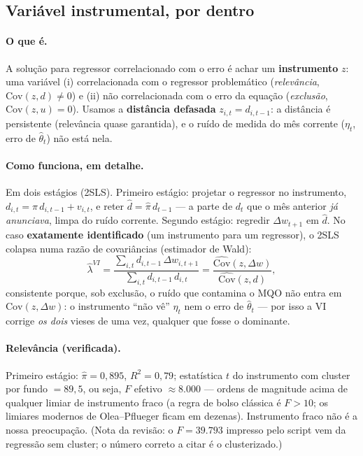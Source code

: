 \documentclass[11pt,a4paper]{article}
\newcommand{\oquee}[0]{\paragraph{O que é.}}
\newcommand{\comofunciona}[0]{\paragraph{Como funciona, em detalhe.}}
\begin{document}
\subsection{Variável instrumental, por dentro}
\label{sec:iv}

\oquee A solução para regressor correlacionado com o erro é achar um \textbf{instrumento} $z$:
uma variável (i) correlacionada com o regressor problemático (\emph{relevância},
$\mathrm{Cov}(z,d)\neq0$) e (ii) não correlacionada com o erro da equação (\emph{exclusão},
$\mathrm{Cov}(z,u)=0$). Usamos a \textbf{distância defasada} $z_{i,t}=d_{i,t-1}$: a distância é
persistente (relevância quase garantida), e o ruído de medida do mês corrente ($\eta_t$, erro de
$\widehat\theta_t$) não está nela.

\comofunciona Em dois estágios (2SLS). Primeiro estágio: projetar o regressor no instrumento,
$d_{i,t}=\pi\,d_{i,t-1}+v_{i,t}$, e reter $\widehat d = \widehat\pi\,d_{t-1}$ --- a parte de
$d_t$ que o mês anterior \emph{já anunciava}, limpa do ruído corrente. Segundo estágio: regredir
$\Delta w_{t+1}$ em $\widehat d$. No caso \textbf{exatamente identificado} (um instrumento para um
regressor), o 2SLS colapsa numa razão de covariâncias (estimador de Wald):
\begin{equation}
\widehat\lambda^{VI}
= \frac{\sum_{i,t} d_{i,t-1}\,\Delta w_{i,t+1}}{\sum_{i,t} d_{i,t-1}\,d_{i,t}}
= \frac{\widehat{\mathrm{Cov}}(z,\Delta w)}{\widehat{\mathrm{Cov}}(z,d)} ,
\end{equation}
consistente porque, sob exclusão, o ruído que contamina o MQO não entra em
$\mathrm{Cov}(z,\Delta w)$: o instrumento ``não vê'' $\eta_t$ nem o erro de $\widehat\theta_t$ ---
por isso a VI corrige \emph{os dois} vieses de uma vez, qualquer que fosse o dominante.

\paragraph{Relevância (verificada).} Primeiro estágio: $\widehat\pi=0{,}895$, $R^2=0{,}79$;
estatística $t$ do instrumento com cluster por fundo $=89{,}5$, ou seja, $F$ efetivo
$\approx8.000$ --- ordens de magnitude acima de qualquer limiar de instrumento fraco (a regra de
bolso clássica é $F>10$; os limiares modernos de Olea--Pflueger ficam em dezenas). Instrumento
fraco não é a nossa preocupação. (Nota da revisão: o $F=39.793$ impresso pelo script vem da
regressão sem cluster; o número correto a citar é o clusterizado.)
\end{document}
